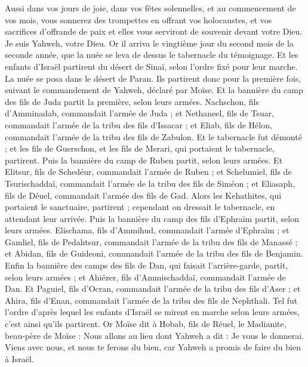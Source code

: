 \begin{multicols}{2}
Aussi dans vos jours de joie, dans vos fêtes solennelles, et au commencement de vos mois, vous sonnerez des trompettes en offrant vos holocaustes, et vos sacrifices d'offrande de paix et elles vous serviront de souvenir devant votre Dieu. Je suis Yahweh, votre Dieu.
Or il arriva le vingtième jour du second mois de la seconde année, que la nuée se leva de dessus le tabernacle du témoignage.
Et les enfants d'Israël partirent du désert de Sinaï, selon l'ordre fixé pour leur marche. La nuée se posa dans le désert de Paran.
Ils partirent donc pour la première fois, suivant le commandement de Yahweh, déclaré par Moïse.
Et la bannière du camp des fils de Juda partit la première, selon leurs armées. Nachschon, fils d'Amminadab, commandait l'armée de Juda ;
et Nethaneel, fils de Tsuar, commandait l'armée de la tribu des fils d'Issacar ;
et Eliab, fils de Hélon, commandait l'armée de la tribu des fils de Zabulon.
Et le tabernacle fut démonté ; et les fils de Guerschon, et les fils de Merari, qui portaient le tabernacle, partirent.
Puis la bannière du camp de Ruben partit, selon leurs armées. Et Elitsur, fils de Schedéur, commandait l'armée de Ruben ;
et Schelumiel, fils de Tsurischaddaï, commandait l'armée de la tribu des fils de Siméon ;
et Eliasaph, fils de Déuel, commandait l'armée des fils de Gad.
Alors les Kehathites, qui portaient le sanctuaire, partirent ; cependant on dressait le tabernacle, en attendant leur arrivée.
Puis la bannière du camp des fils d'Ephraïm partit, selon leurs armées. Elischama, fils d'Ammihud, commandait l'armée d'Ephraïm ;
et Gamliel, fils de Pedahtsur, commandait l'armée de la tribu des fils de Manassé ;
et Abidan, fils de Guideoni, commandait l'armée de la tribu des fils de Benjamin.
Enfin la bannière des camps des fils de Dan, qui faisait l'arrière-garde, partit, selon leurs armées ; et Ahiézer, fils d'Ammischaddaï, commandait l'armée de Dan.
Et Paguiel, fils d'Ocran, commandait l'armée de la tribu des fils d'Aser ;
et Ahira, fils d'Enan, commandait l'armée de la tribu des fils de Nephthali.
Tel fut l'ordre d'après lequel les enfants d'Israël se mirent en marche selon leurs armées, c'est ainsi qu'ils partirent.
Or Moïse dit à Hobab, fils de Réuel, le Madianite, beau-père de Moïse : Nous allons au lieu dont Yahweh a dit : Je vous le donnerai. Viens avec nous, et nous te ferons du bien, car Yahweh a promis de faire du bien à Israël.

\end{multicols}
